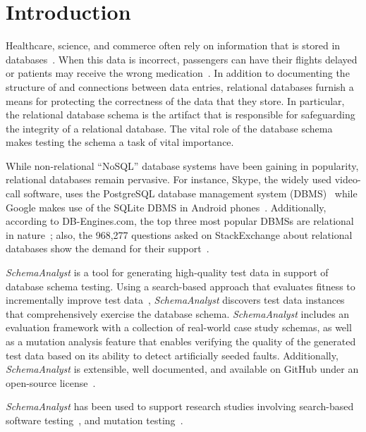 \section{Introduction}\label{sec:intro}

Healthcare, science, and commerce often rely on information that is stored in
databases~\cite{kapfhammer2007comprehensive}.  When this data is incorrect, passengers can have their flights delayed or
patients may receive the wrong medication~\cite{databasebook}.  In addition to documenting the structure of and
connections between data entries, relational databases furnish a means for protecting the correctness of the data that
they store.  In particular, the relational database schema is the artifact that is responsible for safeguarding the
integrity of a relational database. The vital role of the database schema makes testing the schema a task of vital
importance.

While non-relational ``NoSQL'' database systems have been gaining in popularity, relational databases remain pervasive.
For instance, Skype, the widely used video-call software, uses the PostgreSQL database management system
(DBMS)~\cite{postgres} while Google makes use of the SQLite DBMS in Android phones~\cite{sqlite}.  Additionally,
according to DB-Engines.com, the top three most popular DBMSs are relational in nature~\cite{dbrank}; also, the 968,277
questions asked on StackExchange about relational databases show the demand for their support~\cite{stackexchange}.

\textit{SchemaAnalyst} is a tool for generating high-quality test data in support of database schema testing. Using a
search-based approach that evaluates fitness to incrementally improve test data~\cite{Korel:AVM}, \textit{SchemaAnalyst}
discovers test data instances that comprehensively exercise the database schema.  \textit{SchemaAnalyst} includes an
evaluation framework with a collection of real-world case study schemas, as well as a mutation analysis feature that
enables verifying the quality of the generated test data based on its ability to detect artificially seeded faults.
Additionally, \textit{SchemaAnalyst} is extensible, well documented, and available on GitHub under an open-source
license~\cite{tool}.

\textit{SchemaAnalyst} has been used to support research studies involving search-based software
testing~\cite{kapfhammer2013search,mcminn2015effectiveness,kinneer2015automatically}, and mutation
testing~\cite{wright2013efficient,wright2014impact,wright2015mutation,mcminn2016virtual}.

